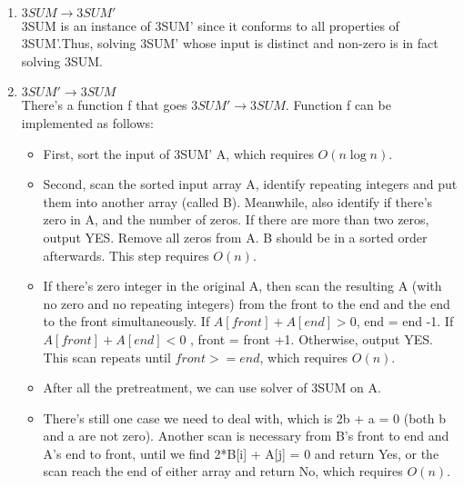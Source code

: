 \begin{problem}{1} ~
\begin{enumerate}
\item $3SUM \rightarrow 3SUM'$\\
3SUM is an instance of 3SUM' since it conforms to all properties of 3SUM'.Thus, solving 3SUM' whose input is distinct and non-zero is in fact solving 3SUM.\\

\item $3SUM' \rightarrow 3SUM$\\
There's a function f that goes $3SUM' \rightarrow 3SUM$. Function f can be implemented as follows:
\begin{itemize}
\item First, sort the input of 3SUM' A, which requires $O(n\log{}n)$.

\item Second, scan the sorted input array A, identify repeating integers and put them into another array (called B). Meanwhile, also identify if there's zero in A, and the number of zeros. If there are more than two zeros, output YES. Remove all zeros from A. B should be in a sorted order afterwards. This step requires $O(n)$.

\item If there's zero integer in the original A, then scan the resulting A (with no zero and no repeating integers) from the front to the end and the end to the front simultaneously. If $A[front] + A[end] > 0$, end = end -1. If $A[front] + A[end] < 0$ , front = front +1. Otherwise, output YES. This scan repeats until $front >= end$, which requires $O(n)$.

\item After all the pretreatment, we can use solver of 3SUM on A.

\item There's still one case we need to deal with, which is 2b + a = 0 (both b and a are not zero). Another scan is necessary from B's front to end and A's end to front, until we find 2*B[i] + A[j] = 0 and return Yes, or the scan reach the end of either array and return No, which requires $O(n)$.
\end{itemize}

\end{enumerate}
\end{problem}